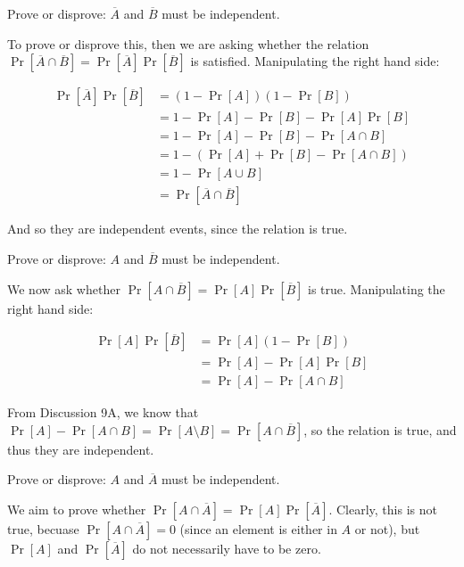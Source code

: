 \documentclass[11pt]{article}
\begin{document}
\begin{Parts}

\Part Prove or disprove: $\overline{A}$ and $\overline{B}$ must be independent.

\begin{solution}
    To prove or disprove this, then we are asking whether the relation $\Pr[\overline A \cap \overline B] = \Pr[\overline A]\Pr [\overline B]$ is satisfied. Manipulating the right hand side: 

    \begin{align*}
        \Pr[\overline A] \Pr[\overline B] &= (1 - \Pr[A])(1 - \Pr[B])\\
        &= 1 - \Pr[A] - \Pr[B] - \Pr[A]\Pr[B]\\
        &=  1 - \Pr[A] - \Pr[B] - \Pr[A \cap B]\\
        &= 1 - (\Pr[A] + \Pr[B] - \Pr[A \cap B])\\
        &= 1 - \Pr[A \cup B]\\
        &= \Pr[\overline A \cap \overline B]
    \end{align*}

    And so they are independent events, since the relation is true.
\end{solution}

\Part Prove or disprove: $A$ and $\overline{B}$ must be independent.

\begin{solution}
    We now ask whether $\Pr[A \cap \overline B] = \Pr[A] \Pr[\overline B]$ is true. Manipulating the right hand side: 

    \begin{align*}
        \Pr[A] \Pr[\overline B] &= \Pr[A](1 - \Pr[B])\\
        &= \Pr[A] - \Pr[A] \Pr[B]\\
        &= \Pr[A] - \Pr[A \cap B]
    \end{align*}

    From Discussion 9A, we know that $\Pr[A] - \Pr[A \cap B] = \Pr[A \setminus B] = \Pr[A \cap \overline B]$, so the relation is true, and thus they are independent.
\end{solution}

\Part Prove or disprove: $A$ and $\overline{A}$ must be independent.

\begin{solution}
    We aim to prove whether $\Pr[A \cap \overline A] = \Pr[A] \Pr[\overline A]$. Clearly, this is not true, becuase $\Pr[A \cap \overline A] = 0$ (since an element is either in $A$ or not), but $\Pr[A]$ and $\Pr[\overline A]$ do not necessarily have to be zero.
\end{solution}


\end{Parts}
\end{document}
